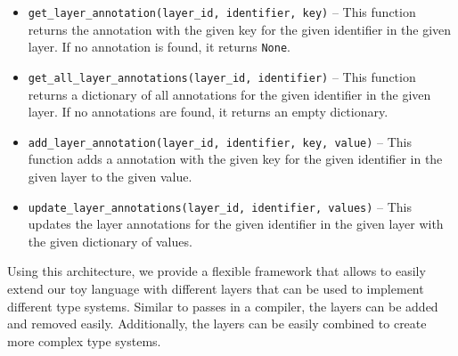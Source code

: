 \begin{itemize}
	\item \texttt{get\_layer\_annotation(layer\_id, identifier, key)} -- This function returns the annotation with the given key for the given identifier in the given layer. If no annotation is found, it returns \texttt{None}.
	\item \texttt{get\_all\_layer\_annotations(layer\_id, identifier)} -- This function returns a dictionary of all annotations for the given identifier in the given layer. If no annotations are found, it returns an empty dictionary.
	\item \texttt{add\_layer\_annotation(layer\_id, identifier, key, value)} -- This function adds a annotation with the given key for the given identifier in the given layer to the given value.
	\item \texttt{update\_layer\_annotations(layer\_id, identifier, values)} -- This updates the layer annotations for the given identifier in the given layer with the given dictionary of values.
\end{itemize}

Using this architecture, we provide a flexible framework that allows to easily extend our toy language with different layers that can be used to implement different type systems. Similar to passes in a compiler, the layers can be added and removed easily. Additionally, the layers can be easily combined to create more complex type systems.
